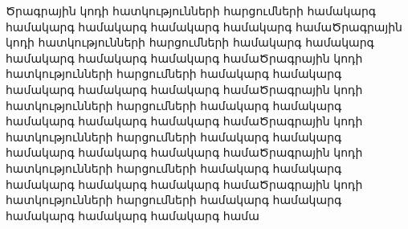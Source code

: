     {
        Ծրագրային կոդի հատկությունների հարցումների համակարգ համակարգ համակարգ համակարգ համակարգ համաԾրագրային կոդի հատկությունների հարցումների համակարգ համակարգ համակարգ համակարգ համակարգ համաԾրագրային կոդի հատկությունների հարցումների համակարգ համակարգ համակարգ համակարգ համակարգ համաԾրագրային կոդի հատկությունների հարցումների համակարգ համակարգ համակարգ համակարգ համակարգ համաԾրագրային կոդի հատկությունների հարցումների համակարգ համակարգ համակարգ համակարգ համակարգ համաԾրագրային կոդի հատկությունների հարցումների համակարգ համակարգ համակարգ համակարգ համակարգ համաԾրագրային կոդի հատկությունների հարցումների համակարգ համակարգ համակարգ համակարգ համակարգ համա
    }
